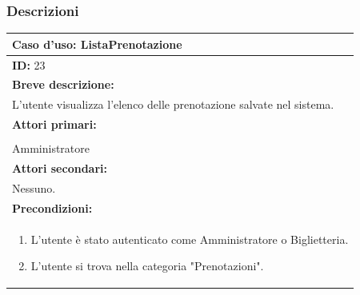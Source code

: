 \documentclass{article}
\begin{document}
            \subsubsection{Descrizioni}
                \begin{table}[H]
                    \begin{tabular}{|p{\linewidth}|}
                        \hline
                        \cellcolor{gray!100}
                        \color{white}
                        \centerline{\textbf{Caso d'uso:} ListaPrenotazione} \\
                        \hline
                        \textbf{ID:} 23 \\
                        \hline
                        \cellcolor{gray!20}
                        \textbf{Breve descrizione:} \\
                        \cellcolor{gray!20}                        
                        L'utente visualizza l'elenco delle prenotazione salvate nel sistema. \\
                        \hline
                        \textbf{Attori primari:} \\
                        \begin{minipage}{\linewidth}
                            Biglietteria \\
                            Amministratore
                        \end{minipage}
                        \vspace {-5pt} \\
                        \hline
                        \textbf{Attori secondari:} \\                        
                        Nessuno. \\
                        \hline
                        \cellcolor{gray!20}
                        \textbf{Precondizioni:} \\
                        \cellcolor{gray!20}
                        \begin{minipage}{\linewidth}
                            \begin{enumerate}
                                \item L'utente è stato autenticato come Amministratore o Biglietteria.
                                \item L'utente si trova nella categoria "Prenotazioni". %
                            \end{enumerate}

\end{minipage}
\end{tabular}
\end{table}
\end{document}

